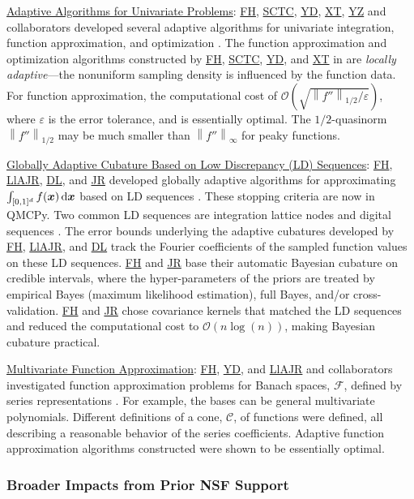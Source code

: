 \documentclass[11pt]{NSFamsart}
\newcommand{\Upara}[1]{\noindent\underline{\upshape #1}:}
\newcommand{\FH}{\hyperlink{FHlink}{FH}\xspace}
\newcommand{\SCTC}{\hyperlink{SCTClink}{SCTC}\xspace}
\newcommand{\YD}{\hyperlink{YDlink}{YD}\xspace}
\newcommand{\JR}{\hyperlink{JRlink}{JR}\xspace}
\newcommand{\LlAJR}{\hyperlink{LlAJRlink}{LlAJR}\xspace}
\newcommand{\XT}{\hyperlink{XTlink}{XT}\xspace}
\newcommand{\DL}{\hyperlink{DLlink}{DL}\xspace}
\newcommand{\YZ}{\hyperlink{YZlink}{YZ}\xspace}
\newcommand{\bx}{{\boldsymbol{x}}}
\def\dif{\textup{d}}
\newcommand{\calc}{{\mathcal{C}}}
\newcommand{\calf}{{\mathcal{F}}}
\newcommand{\norm}[2][{}]{\ensuremath{\left \lVert #2 \right \rVert}_{#1}}
\newcommand{\Order}{\mathcal{O}}
\begin{document}
\Upara{Adaptive Algorithms for Univariate Problems}
\FH, \SCTC, \YD, \XT, \YZ and collaborators developed several adaptive algorithms for univariate integration, function approximation, and optimization \cite{ChoEtal17a,HicEtal14b,  Din15a, Ton14a, Zha18a}.  The function approximation and optimization algorithms constructed by \FH, \SCTC, \YD, and \XT in \cite{ChoEtal17a} are \emph{locally adaptive}---the nonuniform sampling density is influenced by the function data.  For function approximation, the computational cost of $\Order\left(\sqrt{\norm[1/2]{f''}/\varepsilon} \right)$, where $\varepsilon$ is the error tolerance, and is essentially optimal.  The $1/2$-quasinorm $\norm[1/2]{f''}$ may be much smaller than
$\norm[\infty]{f''}$ for peaky functions.


\Upara{Globally Adaptive Cubature Based on Low Discrepancy (LD) Sequences}
\FH, \LlAJR, \DL, and \JR developed globally adaptive algorithms for approximating $\int_{[0,1]^d} f(\bx) \, \dif \bx$ based on LD sequences \cite{HicJim16a,HicEtal17a,JimHic16a}.  These stopping criteria are now in QMCPy. Two common LD sequences are integration lattice nodes and digital sequences \cite{DicEtal14a}.  The error bounds underlying the adaptive cubatures developed by \FH, \LlAJR, and \DL track the  Fourier coefficients of the sampled function values on these LD sequences.  \FH and \JR base their automatic Bayesian cubature on credible intervals, where the hyper-parameters of the priors are treated by empirical Bayes (maximum likelihood estimation), full Bayes, and/or cross-validation.   \FH and \JR chose covariance kernels that matched the LD sequences and reduced the computational cost to $\Order(n \log(n))$, making Bayesian cubature practical.

\Upara{Multivariate Function Approximation}
\FH, \YD, and \LlAJR and collaborators investigated function approximation problems for Banach spaces, $\calf$, defined by series representations \cite{DinHic20a,DinEtal20a}.  For example, the bases can be general multivariate polynomials.  Different definitions of a cone, $\calc$, of functions were defined, all describing a reasonable behavior of the series coefficients.  Adaptive function approximation algorithms constructed were shown to be essentially optimal.


\subsubsection{Broader Impacts from Prior NSF Support} \label{prevBIsect}
\phantom{a}
\end{document}
